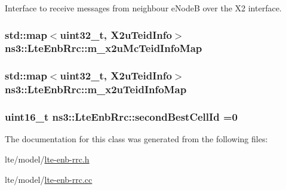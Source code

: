 Interface to receive messages from neighbour e\+NodeB over the X2 interface. 

\subsubsection[{\texorpdfstring{m\+\_\+x2u\+Mc\+Teid\+Info\+Map}{m_x2uMcTeidInfoMap}}]{\setlength{\rightskip}{0pt plus 5cm}std\+::map$<$uint32\+\_\+t, {\bf X2u\+Teid\+Info}$>$ ns3\+::\+Lte\+Enb\+Rrc\+::m\+\_\+x2u\+Mc\+Teid\+Info\+Map\hspace{0.3cm}{\ttfamily [private]}}\hypertarget{classns3_1_1LteEnbRrc_a2e6d93354aecf82495a39fa06c33b558}{}\label{classns3_1_1LteEnbRrc_a2e6d93354aecf82495a39fa06c33b558}
\subsubsection[{\texorpdfstring{m\+\_\+x2u\+Teid\+Info\+Map}{m_x2uTeidInfoMap}}]{\setlength{\rightskip}{0pt plus 5cm}std\+::map$<$uint32\+\_\+t, {\bf X2u\+Teid\+Info}$>$ ns3\+::\+Lte\+Enb\+Rrc\+::m\+\_\+x2u\+Teid\+Info\+Map\hspace{0.3cm}{\ttfamily [private]}}\hypertarget{classns3_1_1LteEnbRrc_acf64b26e133b693531c511792656cf81}{}\label{classns3_1_1LteEnbRrc_acf64b26e133b693531c511792656cf81}
\subsubsection[{\texorpdfstring{second\+Best\+Cell\+Id}{secondBestCellId}}]{\setlength{\rightskip}{0pt plus 5cm}uint16\+\_\+t ns3\+::\+Lte\+Enb\+Rrc\+::second\+Best\+Cell\+Id =0}\hypertarget{classns3_1_1LteEnbRrc_ad1ecf3d722f64bf11fbc6c4ff1903069}{}\label{classns3_1_1LteEnbRrc_ad1ecf3d722f64bf11fbc6c4ff1903069}


The documentation for this class was generated from the following files\+:\begin{DoxyCompactItemize}
\item 
lte/model/\hyperlink{lte-enb-rrc_8h}{lte-\/enb-\/rrc.\+h}\item 
lte/model/\hyperlink{lte-enb-rrc_8cc}{lte-\/enb-\/rrc.\+cc}\end{DoxyCompactItemize}
